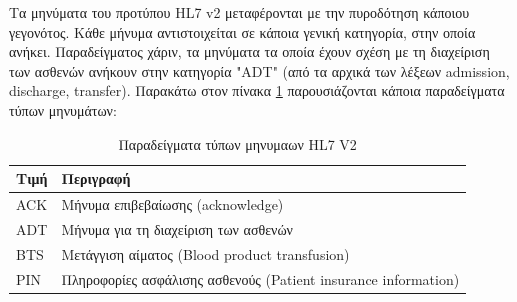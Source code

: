 		Τα μηνύματα του προτύπου HL7 v2 μεταφέρονται με την πυροδότηση κάποιου γεγονότος. Κάθε μήνυμα αντιστοιχείται σε κάποια γενική κατηγορία, στην οποία ανήκει. Παραδείγματος χάριν, τα μηνύματα τα οποία έχουν σχέση με τη διαχείριση των ασθενών ανήκουν στην κατηγορία "ADT" (από τα αρχικά των λέξεων admission, discharge, transfer). Παρακάτω στον πίνακα \ref{tab:HL7_V2_message_types} παρουσιάζονται κάποια παραδείγματα τύπων μηνυμάτων:	
	\begin{table}[h]
		\begin{center}
		    \begin{tabular}{|l|l|}
		    \hline
		    \rowcolor{grayy}
		    \textbf{Τιμή} & \textbf{Περιγραφή}
		    \\ \hline
		     ACK & Μήνυμα επιβεβαίωσης (acknowledge)
		     \\ \hline
		     ADT & Μήνυμα για τη διαχείριση των ασθενών
		     \\ \hline
		     BTS & Μετάγγιση αίματος (Blood product transfusion)
		     \\ \hline
		     PIN & Πληροφορίες ασφάλισης ασθενούς (Patient insurance information)
		     \\ \hline
		    \end{tabular}
		    \caption{Παραδείγματα τύπων μηνυμαων HL7 V2}
			\label{tab:HL7_V2_message_types}
		\end{center}
	\end{table}
	

